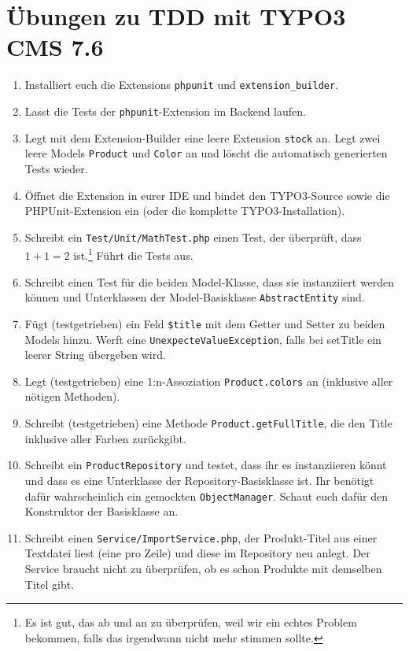 \documentclass[a4paper,12pt]{scrartcl}
\begin{document}
\raggedbottom

\section*{Übungen zu TDD mit TYPO3 CMS 7.6}

\begin{enumerate}
  \item Installiert euch die Extensions \texttt{phpunit} und \texttt{extension\_builder}.
  
  \item Lasst die Tests der \texttt{phpunit}-Extension im Backend laufen.
  
  \item Legt mit dem Extension-Builder eine leere Extension \texttt{stock} an. Legt zwei leere Models \texttt{Product} und \texttt{Color} an und löscht die automatisch generierten Tests wieder.
  
  \item Öffnet die Extension in eurer IDE und bindet den TYPO3-Source sowie die PHPUnit-Extension ein (oder die komplette TYPO3-Installation).
  
  \item Schreibt ein \texttt{Test/Unit/MathTest.php} einen Test, der überprüft, dass $1 + 1 = 2$ ist.\footnote{Es ist gut, das ab und an zu überprüfen, weil wir ein echtes Problem bekommen, falls das irgendwann nicht mehr stimmen sollte.} Führt die Tests aus.
  
  \item Schreibt einen Test für die beiden Model-Klasse, dass sie instanziiert werden können und Unterklassen der Model-Basisklasse \texttt{AbstractEntity} sind.
  
  \item Fügt (testgetrieben) ein Feld \texttt{\$title} mit dem Getter und Setter zu beiden Models hinzu. Werft eine \texttt{UnexpecteValueException}, falls bei setTitle ein leerer String übergeben wird.
  
  \item Legt (testgetrieben) eine 1:n-Assoziation \texttt{Product.colors} an (inklusive aller nötigen Methoden).
  
  \item Schreibt (testgetrieben) eine Methode \texttt{Product.getFullTitle}, die den Title inklusive aller Farben zurückgibt.
  
  \item Schreibt ein \texttt{ProductRepository} und testet, dass ihr es instanziieren könnt und dass es eine Unterklasse der Repository-Basisklasse ist. Ihr benötigt dafür wahrscheinlich ein gemockten \texttt{ObjectManager}. Schaut euch dafür den Konstruktor der Basisklasse an.
  
  \item Schreibt einen \texttt{Service/ImportService.php}, der Produkt-Titel aus einer Textdatei liest (eine pro Zeile) und diese im Repository neu anlegt. Der Service braucht nicht zu überprüfen, ob es schon Produkte mit demselben Titel gibt.
 
\end{enumerate}
\end{document}
